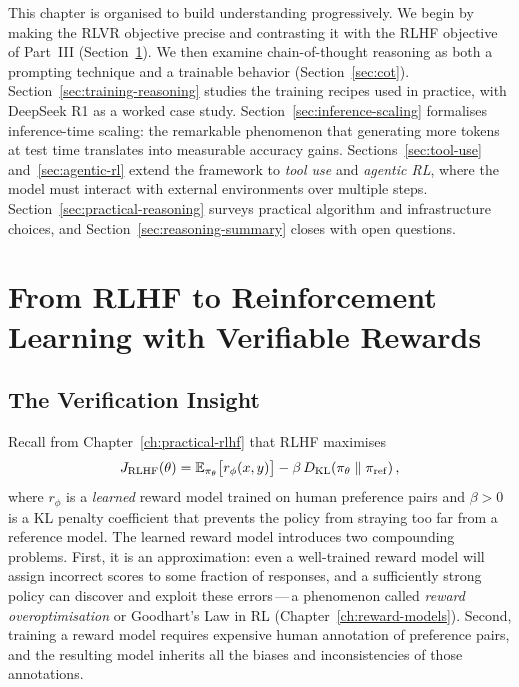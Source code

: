 This chapter is organised to build understanding progressively. We begin
by making the RLVR objective precise and contrasting it with
the RLHF objective of Part~III
(Section~\ref{sec:rlvr}). We then examine chain-of-thought
reasoning as both a prompting technique and a trainable
behavior (Section~\ref{sec:cot}). Section~\ref{sec:training-reasoning}
studies the training recipes used in practice, with DeepSeek R1 as a
worked case study. Section~\ref{sec:inference-scaling} formalises
inference-time scaling: the remarkable phenomenon that generating more
tokens at test time translates into measurable accuracy gains.
Sections~\ref{sec:tool-use} and~\ref{sec:agentic-rl} extend the
framework to \emph{tool use} and \emph{agentic
RL}, where the model must interact with
external environments over multiple steps. Section~\ref{sec:practical-reasoning}
surveys practical algorithm and infrastructure choices, and
Section~\ref{sec:reasoning-summary} closes with open questions.

\section{From RLHF to Reinforcement Learning with Verifiable Rewards}
\label{sec:rlvr}

\subsection{The Verification Insight}

Recall from Chapter~\ref{ch:practical-rlhf} that RLHF maximises
\begin{equation}
\label{eq:rlhf-objective}
J_{\mathrm{RLHF}}(\theta)
  = \operatorname{\mathbb{E}}_{\pi_\theta}\bigl[r_\phi(x, y)\bigr]
  - \beta\,D_{\mathrm{KL}}\!\left(\pi_\theta\;\|\;\pi_{\mathrm{ref}}\right),
\end{equation}
where $r_\phi$ is a \emph{learned} reward model trained on human
preference pairs and $\beta > 0$ is a KL penalty coefficient that
prevents the policy from straying too far from a reference model.
The learned reward model introduces two compounding problems. First, it
is an approximation: even a well-trained reward model will assign
incorrect scores to some fraction of responses, and a sufficiently
strong policy can discover and exploit these errors\,---\,a phenomenon
called \emph{reward overoptimisation}
or Goodhart's Law in RL (Chapter~\ref{ch:reward-models}). Second,
training a reward model requires expensive human annotation of
preference pairs, and the resulting model inherits all the biases and
inconsistencies of those annotations.

